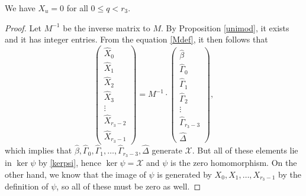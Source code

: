 \begin{cor}
We have $X_u=0$ for all $0\leq q <r_3$.
\end{cor}
\begin{proof}
Let $M^{-1}$ be the inverse matrix to $M$. By Proposition \ref{unimod}, it exists and it has integer entries. From the equation \eqref{Mdef}, it then follows that
\begin{equation*}
\begin{pmatrix}
\widehat{X}_0\\ 
\widehat{X}_1 \\
\widehat{X}_2 \\ 
\widehat{X}_3 \\ 
\vdots\\ 
\widehat{X}_{r_3-2}\\
\widehat{X}_{r_3-1}
\end{pmatrix}
=
M^{-1}\cdot
\begin{pmatrix}
\widehat{\beta}\\ 
\widehat{\Gamma}_0\\ 
\widehat{\Gamma}_1\\ 
\widehat{\Gamma}_2 \\ 
\vdots\\ 
\widehat{\Gamma}_{r_3-3} \\ 
\widehat{\Delta}
\end{pmatrix},
\end{equation*}
which implies that $\widehat{\beta},\widehat{\Gamma}_0,\widehat{\Gamma}_1,\dots,\widehat{\Gamma}_{r_3-3}, \widehat{\Delta}$ generate $\mathcal{X}$. But all of these elements lie in $\ker \psi$ by \eqref{kerpsi}, hence $\ker \psi = \mathcal{X}$ and $\psi$ is the zero homomorphism. On the other hand, we know that the image of $\psi$ is generated by $X_0,X_1,\dots,X_{r_3-1}$ by the definition of $\psi$, so all of these must be zero as well.
\end{proof}

